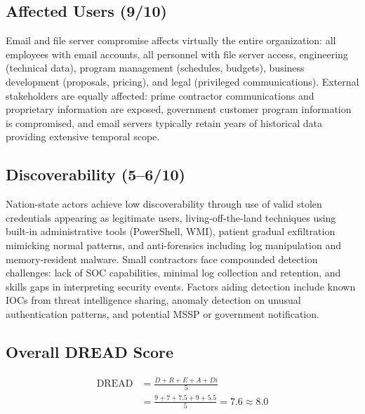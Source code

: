 \documentclass[sigconf,nonacm]{acmart}
\begin{document}
\subsection{Affected Users (9/10)}

Email and file server compromise affects virtually the entire organization: all employees
with email accounts, all personnel with file server access, engineering (technical data),
program management (schedules, budgets), business development (proposals, pricing), and
legal (privileged communications). External stakeholders are equally affected: prime
contractor communications and proprietary information are exposed, government customer
program information is compromised, and email servers typically retain years of
historical data providing extensive temporal scope.

\subsection{Discoverability (5--6/10)}

Nation-state actors achieve low discoverability through use of valid stolen credentials
appearing as legitimate users, living-off-the-land techniques using built-in
administrative tools (PowerShell, WMI), patient gradual exfiltration mimicking normal
patterns, and anti-forensics including log manipulation and memory-resident malware.
Small contractors face compounded detection challenges: lack of SOC capabilities,
minimal log collection and retention, and skills gaps in interpreting security events.
Factors aiding detection include known IOCs from threat intelligence sharing, anomaly
detection on unusual authentication patterns, and potential MSSP or government
notification.

\subsection{Overall DREAD Score}

\begin{align*}
\text{DREAD} &= \frac{D + R + E + A + Di}{5} \\
             &= \frac{9 + 7 + 7.5 + 9 + 5.5}{5} = 7.6 \approx 8.0
\end{align*}
\end{document}

